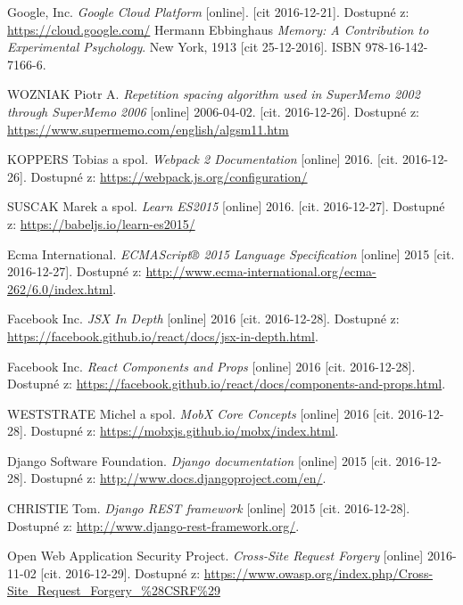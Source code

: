 \documentclass[a4paper,11pt,titlepage,fleqn]{article}
\begin{document}
\begin{thebibliography}{99}
        Google, Inc. \textit{Google Cloud Platform} [online]. [cit 2016-12-21]. Dostupné z: \url{https://cloud.google.com/}
		Hermann Ebbinghaus \textit{Memory: A Contribution to Experimental Psychology}. New York, 1913 [cit 25-12-2016]. ISBN 978-16-142-7166-6.

        WOZNIAK Piotr A. \textit{Repetition spacing algorithm used in SuperMemo 2002 through SuperMemo 2006} [online] 2006-04-02. [cit. 2016-12-26]. Dostupné z: \url{https://www.supermemo.com/english/algsm11.htm}

        KOPPERS Tobias a spol. \textit{Webpack 2 Documentation} [online] 2016. [cit. 2016-12-26]. Dostupné z: \url{https://webpack.js.org/configuration/}

        SUSCAK Marek a spol. \textit{Learn ES2015} [online] 2016. [cit. 2016-12-27]. Dostupné z: \url{https://babeljs.io/learn-es2015/}
        
        Ecma International. \textit{ECMAScript® 2015 Language Specification} [online] 2015 [cit. 2016-12-27]. Dostupné z: \url{http://www.ecma-international.org/ecma-262/6.0/index.html}.

        Facebook Inc. \textit{JSX In Depth} [online] 2016 [cit. 2016-12-28]. Dostupné z: \url{https://facebook.github.io/react/docs/jsx-in-depth.html}.

        Facebook Inc. \textit{React Components and Props} [online] 2016 [cit. 2016-12-28]. Dostupné z: \url{https://facebook.github.io/react/docs/components-and-props.html}.
        
        WESTSTRATE Michel a spol. \textit{MobX Core Concepts} [online] 2016 [cit. 2016-12-28].
        Dostupné z: \url{https://mobxjs.github.io/mobx/index.html}.

        Django Software Foundation. \textit{Django documentation} [online] 2015 [cit. 2016-12-28]. Dostupné z: \url{http://www.docs.djangoproject.com/en/}.

        CHRISTIE Tom. \textit{Django REST framework} [online] 2015 [cit. 2016-12-28]. Dostupné z: \url{http://www.django-rest-framework.org/}.

       Open Web Application Security Project. \textit{Cross-Site Request Forgery} [online] 2016-11-02 [cit. 2016-12-29]. Dostupné z: \url{https://www.owasp.org/index.php/Cross-Site_Request_Forgery_%28CSRF%29}
        
\end{thebibliography}
\end{document}
